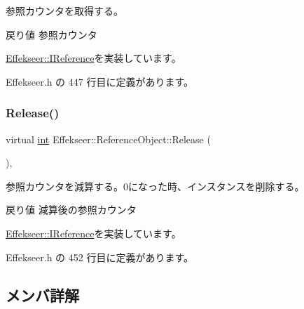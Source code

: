 参照カウンタを取得する。 

\begin{DoxyReturn}{戻り値}
参照カウンタ 
\end{DoxyReturn}


\mbox{\hyperlink{class_effekseer_1_1_i_reference_a95274c788c8c03d27a3e424facc728b6}{Effekseer\+::\+I\+Reference}}を実装しています。



 Effekseer.\+h の 447 行目に定義があります。

\mbox{\label{class_effekseer_1_1_reference_object_a6b0e9aa4d994b557d499b15359b580d8}} 
\subsubsection{\texorpdfstring{Release()}{Release()}}
{\footnotesize\ttfamily virtual \mbox{\hyperlink{namespace_effekseer_ace0abf7c2e6947e519ebe8b54cbcc30a}{int}} Effekseer\+::\+Reference\+Object\+::\+Release (\begin{DoxyParamCaption}{ }\end{DoxyParamCaption})\hspace{0.3cm}{\ttfamily [inline]}, {\ttfamily [virtual]}}



参照カウンタを減算する。0になった時、インスタンスを削除する。 

\begin{DoxyReturn}{戻り値}
減算後の参照カウンタ 
\end{DoxyReturn}


\mbox{\hyperlink{class_effekseer_1_1_i_reference_ad8d601188c0f088f4748aa2da8758bb5}{Effekseer\+::\+I\+Reference}}を実装しています。



 Effekseer.\+h の 452 行目に定義があります。



\subsection{メンバ詳解}
\mbox{\label{class_effekseer_1_1_reference_object_a916a836400f9a2876ec6f0e0a0003aa7}} 
